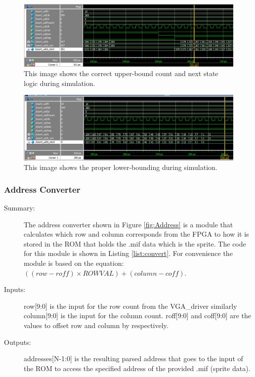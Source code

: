 \documentclass[a4paper]{article}
\begin{document}
\begin{figure}[H]
    \centering
    \includegraphics[width=5.91in]{Images/matthew_blocks/countUDSim2.png}
    \caption{This image shows the correct upper-bound count and next state logic during simulation.}
    \label{fig:count_udS2}
\end{figure}

\begin{figure}[H]
    \centering
    \includegraphics[width=5.91in]{Images/matthew_blocks/countUDSim3.png}
    \caption{This image shows the proper lower-bounding during simulation.}
    \label{fig:count_udS3}
\end{figure}

\subsubsection{Address Converter}
\begin{description}
    \item[Summary: ] The address converter shown in Figure \ref{fig:Address} is a module that calculates which row and column corresponds from the FPGA to how it is stored in the ROM that holds the .mif data which is the sprite. The code for this module is shown in Listing \ref{list:convert}. For convenience the module is based on the equation: $ ((row − roff) \times  ROWVAL) + (column − coff)$.
    
    \item[Inputs: ] row[9:0] is the input for the row count from the VGA\_driver similarly column[9:0] is the input for the column count. roff[9:0] and coff[9:0] are the values to offset row and column by respectively.
    
    \item[Outputs: ] addresses[N-1:0] is the resulting parsed address that goes to the input of the ROM to access the specified address of the provided .mif (sprite data).
\end{description}
\end{document}
